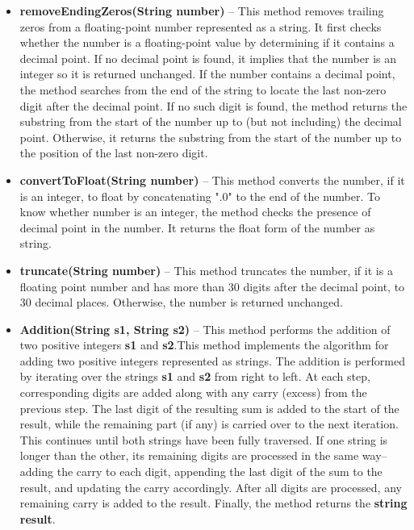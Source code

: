 \documentclass[a4paper,12pt]{article}
\begin{document}
{\begin{itemize}
    \item \textbf{removeEndingZeros(String number)} -- This method removes trailing zeros from a floating-point number represented as a string. It first checks whether the number is a floating-point value by determining if it contains a decimal point. If no decimal point is found, it implies that the number is an integer so it is returned unchanged. If the number contains a decimal point, the method searches from the end of the string to locate the last non-zero digit after the decimal point. If no such digit is found, the method returns the substring from the start of the number up to (but not including) the decimal point. Otherwise, it returns the substring from the start of the number up to the position of the last non-zero digit.\\

    \item \textbf{convertToFloat(String number)} -- This method converts the number, if it is an integer, to float by concatenating "$.0$" to the end of the number. To know whether number is an integer, the method checks the presence of decimal point in the number. It returns the float form of the number as string.\\

    \item \textbf{truncate(String number)} -- This method truncates the number, if it is a floating point number and has more than 30 digits after the decimal point, to 30 decimal places. Otherwise, the number is returned unchanged.\\

    \item \textbf{Addition(String s1, String s2)} -- This method performs the addition of two positive integers \textbf{s1} and \textbf{s2}.This method implements the algorithm for adding two positive integers represented as strings. The addition is performed by iterating over the strings \textbf{s1} and \textbf{s2} from right to left. At each step, corresponding digits are added along with any carry (excess) from the previous step. The last digit of the resulting sum is added to the start of the result, while the remaining part (if any) is carried over to the next iteration. This continues until both strings have been fully traversed. If one string is longer than the other, its remaining digits are processed in the same way--adding the carry to each digit, appending the last digit of the sum to the result, and updating the carry accordingly. After all digits are processed, any remaining carry is added to the result. Finally, the method returns the \textbf{string result}.\\


\end{itemize}}
\end{document}

